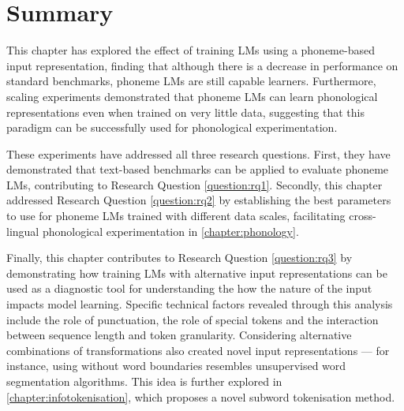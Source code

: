 \section{Summary}

This chapter has explored the effect of training LMs using a phoneme-based input representation, finding that although there is a decrease in performance on standard benchmarks, phoneme LMs are still capable learners. Furthermore, scaling experiments demonstrated that phoneme LMs can learn phonological representations even when trained on very little data, suggesting that this paradigm can be successfully used for phonological experimentation. 

These experiments have addressed all three research questions. First, they have demonstrated that text-based benchmarks can be applied to evaluate phoneme LMs, contributing to Research Question \ref{question:rq1}. Secondly, this chapter addressed Research Question \ref{question:rq2} by establishing the best parameters to use for phoneme LMs trained with different data scales, facilitating cross-lingual phonological experimentation in  \cref{chapter:phonology}.

Finally, this chapter contributes to Research Question \ref{question:rq3} by demonstrating how training LMs with alternative input representations can be used as a diagnostic tool for understanding the how the nature of the input impacts model learning. Specific technical factors revealed through this analysis include the role of punctuation, the role of special tokens and the interaction between sequence length and token granularity. Considering alternative combinations of transformations also created novel input representations --- for instance, using \bpe without word boundaries resembles unsupervised word segmentation algorithms. This idea is further explored in \cref{chapter:infotokenisation}, which proposes a novel subword tokenisation method.
